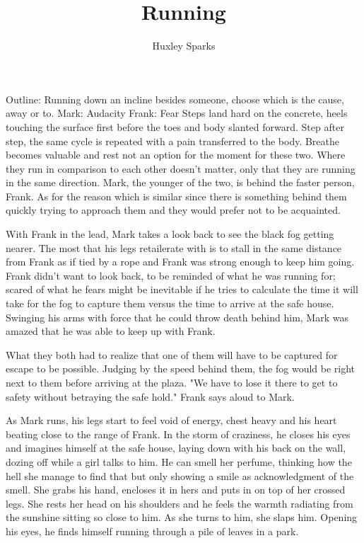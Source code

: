 \title{Running}
\author{Huxley Sparks}
\begin{Document}
    Outline:  Running down an incline besides someone, choose which is the cause, away or to. 
                Mark: Audacity
                Frank: Fear
        Steps land hard on the concrete, heels touching the surface first before the toes and body slanted forward. Step after step, the same cycle
    is repeated with a pain transferred to the body. Breathe becomes valuable and rest not an option for the moment for these two. Where they run
    in comparison to each other doesn't matter, only that they are running in the same direction. Mark, the younger of the two, is behind the faster
    person, Frank. As for the reason which is similar since there is something behind them quickly trying to approach them and they would prefer 
    not to be acquainted.

        With Frank in the lead, Mark takes a look back to see the black fog getting nearer. The most that his legs retailerate with is to stall in
    the same distance from Frank as if tied by a rope and Frank was strong enough to keep him going. Frank didn't want to look back, to be reminded
    of what he was running for;  scared of what he fears might be inevitable if he tries to calculate the time it will take for the fog to capture them
    versus the time to arrive at the safe house. Swinging his arms with force that he could throw death behind him, Mark was amazed that he was able
    to keep up with Frank.

       What they both had to realize that one of them will have to be captured for escape to be possible. Judging by the speed behind them, the fog
    would be right next to them before arriving at the plaza. "We have to lose it there to get to safety without betraying the safe hold." Frank
    says aloud to Mark.

        As Mark runs, his legs start to feel void of energy, chest heavy and his heart beating close to the range of Frank. In the storm of craziness,
    he closes his eyes and imagines himself at the safe house, laying down with his back on the wall, dozing off while a girl talks to him. He can
    smell her perfume, thinking how the hell she manage to find that but only showing a smile as acknowledgment of the smell. She grabs his hand, encloses
    it in hers and puts in on top of her crossed legs. She rests her head on his shoulders and he feels the warmth radiating from the sunshine sitting
    so close to him. As she turns to him, she slaps him. Opening his eyes, he finds himself running through a pile of leaves in a park.


\end{Document}
